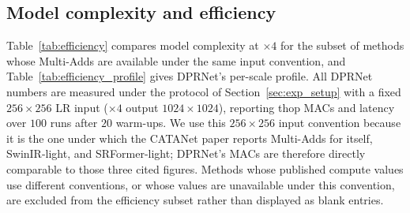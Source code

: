 \subsection{Model complexity and efficiency}
\label{sec:efficiency}

Table~\ref{tab:efficiency} compares model complexity at $\times4$ for the subset of
methods whose Multi-Adds are available under the same input convention, and
Table~\ref{tab:efficiency_profile} gives DPRNet's per-scale profile. All DPRNet
numbers are measured under the protocol of Section~\ref{sec:exp_setup} with a fixed
$256{\times}256$ LR input ($\times4$ output $1024{\times}1024$), reporting thop
MACs and latency over $100$ runs after $20$ warm-ups. We use this
$256{\times}256$ input convention because it is the one under which the CATANet
paper reports Multi-Adds for itself, SwinIR-light, and SRFormer-light; DPRNet's
MACs are therefore directly comparable to those three cited figures. Methods whose
published compute values use different conventions, or whose values are unavailable
under this convention, are excluded from the efficiency subset rather than displayed
as blank entries.

